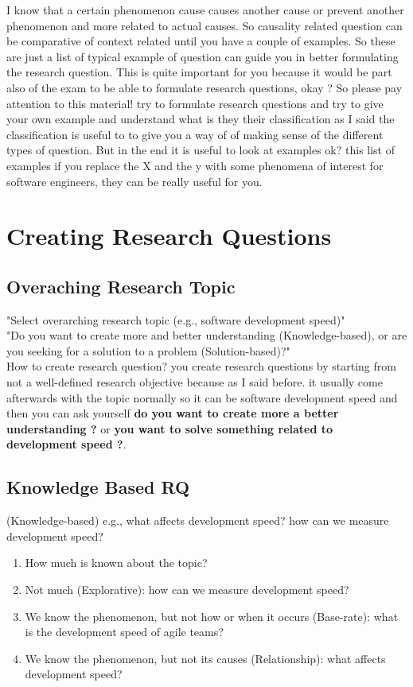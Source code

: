 \documentclass[conference, compsoc, twoside]{IEEEtran}
\begin{document}
I know that a certain phenomenon cause causes another cause or prevent another phenomenon and more related to actual causes.
So causality related question can be comparative of context related until you have a couple of examples. 
So these are just a list of typical example of question can guide you in better formulating the research question.
This is quite important for you because it would be part also of the exam to be able to formulate research questions, okay ? 
So please pay attention to this material! try to formulate research questions and try to give your own example and 
understand what is they their classification as I said the classification is useful to to give you a way of of making sense of the different types of question. 
But in the end it is useful to look at examples ok? this list of examples if you replace the X and the y with some phenomena of interest for software engineers, they can be really useful for you.


\section{Creating Research Questions} %
\subsection{Overaching Research Topic} %
\label{sub:overaching_research_topic}
"Select overarching research topic (e.g., software development speed)"\\	
"Do you want to create more and better understanding (Knowledge-based), or are you seeking for a solution to a problem (Solution-based)?"\\

How to create research question? you create research questions by starting from not a well-defined research objective because as I said before. 
it usually come afterwards with the topic normally so it can be software development speed and then you can ask yourself \textbf{do you want to create more a better understanding ?} or 
\textbf{you want to solve something related to development speed ?}.

\subsection{Knowledge Based RQ} %
(Knowledge-based) e.g., what affects development speed? how can we measure development speed?
\begin{enumerate}
	\item How much is known about the topic?
	\item Not much (Explorative): how can we measure development speed?
	\item We know the phenomenon, but not how or when it occurs (Base-rate): what is the
	development speed of agile teams?
	\item We know the phenomenon, but not its causes (Relationship): what affects development
	speed?
\end{enumerate}
\end{document}
